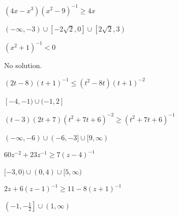 \documentclass{ximera}
\begin{document}
\begin{question}
\begin{problem}
$(4x-x^3)(x^{2} - 9)^{-1} \geq 4x$

\begin{solution}
$(-\infty, -3) \cup \left[-2\sqrt{2}, 0\right] \cup \left[2\sqrt{2}, 3\right)$
\end{solution}
\end{problem} 

\begin{problem}
$(x^{2} + 1)^{-1} < 0$

\begin{solution}
No solution.
\end{solution}
\end{problem}  

\begin{problem}
$(2t-8)(t+1)^{-1} \leq (t^2-8t)(t+1)^{-2}$ 

\begin{solution}
$[-4, -1) \cup (-1,2]$
\end{solution}
\end{problem}  

\begin{problem}
$(t-3)(2t+7)(t^2+7t+6)^{-2} \geq (t^2+7t+6)^{-1}$

\begin{solution}
$(-\infty, -6) \cup (-6, -3] \cup [9, \infty)$   
\end{solution}
 
\end{problem} 

\begin{problem}
$60z^{-2}+23z^{-1} \geq 7(z-4)^{-1}$

\begin{solution}
$[-3,0) \cup (0,4) \cup [5, \infty)$
\end{solution}
\end{problem} 

\begin{problem}\label{ratlineqexerciselast}
$2z+6(z-1)^{-1} \geq 11 - 8(z+1)^{-1}$

\begin{solution}
$\left(-1,-\frac{1}{2}\right] \cup (1, \infty)$
\end{solution}
\end{problem}  
\end{question}
\end{document}
